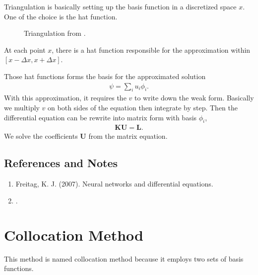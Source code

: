 \documentclass[letterpaper,12pt,english]{sphinxmanual}
\begin{document}
Triangulation is basically setting up the basis function in a discretized space \(x\). One of the choice is the hat function.
\begin{figure}[htbp]
\centering
\capstart

\noindent{}
\caption{Triangulation from .}\label{\detokenize{finite-element-method/galerkin-method:id1}}\end{figure}

At each point \(x\), there is a hat function responsible for the approximation within \([x-\Delta x, x+\Delta x]\).

Those hat functions forms the basis for the approximated solution
\begin{equation*}
\begin{split}\psi = \sum_i u_i \phi_i.\end{split}
\end{equation*}
With this approximation, it requires the  \(v\) to write down the weak form. Basically we multiply \(v\) on both sides of the equation then integrate by step. Then the differential equation can be rewrite into matrix form with basis \(\phi_i\),
\begin{equation*}
\begin{split}\mathbf K \mathbf U = \mathbf L.\end{split}
\end{equation*}
We solve the coefficients \(\mathbf U\) from the matrix equation.


\subsection{References and Notes}
\label{\detokenize{finite-element-method/galerkin-method:references-and-notes}}\begin{enumerate}
\item {} 
Freitag, K. J. (2007). Neural networks and differential equations.

\item {} 
.

\end{enumerate}


\section{Collocation Method}
\label{\detokenize{finite-element-method/collocation-method::doc}}\label{\detokenize{finite-element-method/collocation-method:collocation-method}}
This method is named collocation method because it employs two sets of basis functions.
\end{document}
